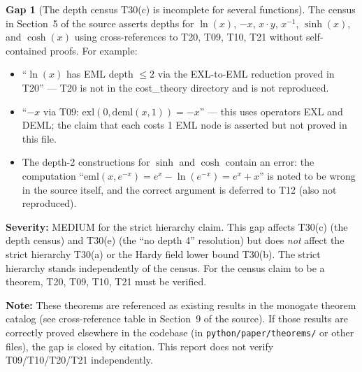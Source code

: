 \documentclass[12pt,a4paper]{article}
\theoremstyle{definition}
\newtheorem{gap}{Gap}
\theoremstyle{remark}
\begin{document}
\begin{gap}[The depth census T30(c) is incomplete for several
functions]\label{gap:census}
The census in Section~5 of the source asserts depths for
$\ln(x)$, $-x$, $x\cdot y$, $x^{-1}$, $\sinh(x)$, and $\cosh(x)$ using
cross-references to T20, T09, T10, T21 without self-contained proofs.
For example:
\begin{itemize}
  \item ``$\ln(x)$ has EML depth $\leq 2$ via the EXL-to-EML reduction
        proved in T20'' --- T20 is not in the cost\_theory directory and is
        not reproduced.
  \item ``$-x$ via T09: $\mathrm{exl}(0,\mathrm{deml}(x,1))=-x$'' ---
        this uses operators EXL and DEML; the claim that each costs 1 EML node
        is asserted but not proved in this file.
  \item The depth-2 constructions for $\sinh$ and $\cosh$ contain an error:
        the computation ``$\mathrm{eml}(x,e^{-x})=e^x-\ln(e^{-x})=e^x+x$''
        is noted to be wrong in the source itself, and the correct argument is
        deferred to T12 (also not reproduced).
\end{itemize}

\noindent\textbf{Severity:} MEDIUM for the strict hierarchy claim.
This gap affects T30(c) (the depth census) and T30(e) (the ``no depth 4''
resolution) but does \emph{not} affect the strict hierarchy T30(a) or the
Hardy field lower bound T30(b).  The strict hierarchy stands independently of
the census.  For the census claim to be a theorem, T20, T09, T10, T21 must be
verified.

\noindent\textbf{Note:} These theorems are referenced as existing results in the
monogate theorem catalog (see cross-reference table in Section~9 of the source).
If those results are correctly proved elsewhere in the codebase (in
\texttt{python/paper/theorems/} or other files), the gap is closed by citation.
This report does not verify T09/T10/T20/T21 independently.
\end{gap}
\end{document}
